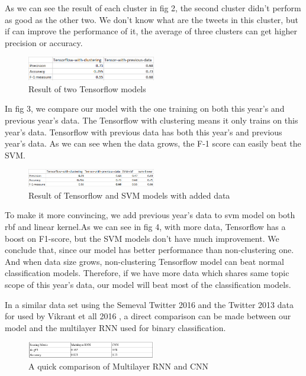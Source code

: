 \documentclass[conference]{IEEEtran}
\begin{document}
As we can see the result of each cluster in fig 2, the second cluster didn't perform as good as the other two. We don't know what are the tweets in this cluster, but if can improve the performance of it, the average of three clusters can get higher precision or accuracy.

\begin{figure}[h]
\centering
\includegraphics[width=0.5\textwidth]{Capture(4)}
\caption{Result of two Tensorflow models}
\end{figure}

In fig 3, we compare our model with the one training on both this year's and previous year's data. The Tensorflow with clustering means it only trains on this year's data. Tensorflow with previous data has both this year's and previous year's data. As we can see when the data grows, the F-1 score can easily beat the SVM. 

\begin{figure}[h]
\centering
\includegraphics[width=0.5\textwidth]{Capture(5)}
\caption{Result of Tensorflow and SVM models with added data}
\end{figure}


To make it more convincing, we add previous year's data to svm model on both rbf and linear kernel.As we can see in fig 4, with more data, Tensorflow has a boost on F1-score, but the SVM models don't have much improvement. We conclude that, since our model has better performance than non-clustering one. And when data size grows, non-clustering Tensorflow model can beat normal classification models. Therefore, if we have more data which shares same topic scope of this year's data, our model will beat most of the classification models.


In a similar data set using the Semeval Twitter 2016 and the Twitter 2013 data for used by Vikrant et all 2016 , a direct comparison can be made between our model and the multilayer RNN used for binary classification. 
\begin{figure}[h]
\centering
\includegraphics[width=0.5\textwidth]{Capture(6)}
\caption{A quick comparison of Multilayer RNN and CNN}
\end{figure}
\end{document}
